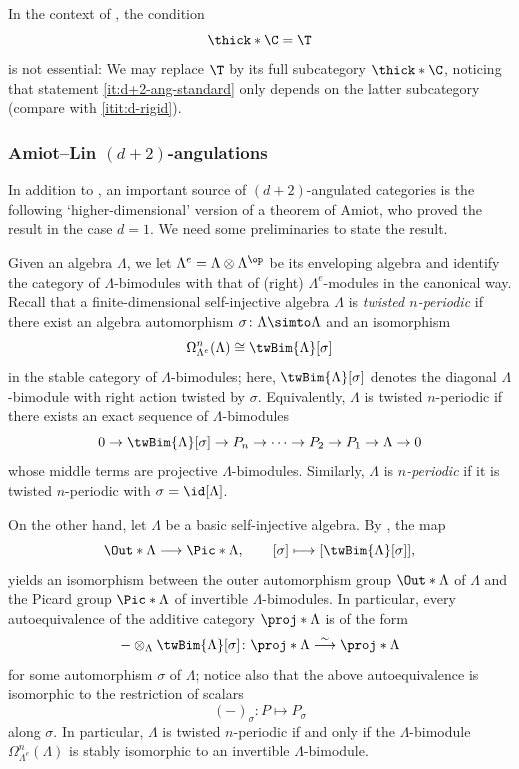 \documentclass[a4paper]{amsart}
\begin{document}
\begin{remark}
  In the context of , the
  condition $$\thick*{\C}=\T$$ is not essential: We may replace $\T$ by its full
  subcategory $\thick*\C$, noticing that statement \eqref{it:d+2-ang-standard}
  only depends on the latter subcategory (compare with \eqref{itit:d-rigid}).
\end{remark}

\subsubsection{Amiot--Lin $(d+2)$-angulations}
\label{subsec:AL_angulations}

In addition to , an important source of $(d+2)$-angulated
categories is the following `higher-dimensional' version of a theorem of Amiot,
who proved the result in the case $d=1$. We need some preliminaries to state the
result.

Given an algebra $\Lambda$, we let $\Lambda^e=\Lambda\otimes\Lambda^\op$ be its
enveloping algebra and identify the category of $\Lambda$-bimodules with
that of (right) $\Lambda^e$-modules in the canonical way. Recall that a
finite-dimensional self-injective algebra $\Lambda$ is \emph{twisted
  $n$-periodic} if there exist an algebra automorphism $\sigma\colon
\Lambda\simto \Lambda$ and an isomorphism
\[
  \Omega_{\Lambda^e}^n(\Lambda)\cong \twBim{\Lambda}[\sigma]
\]
in the stable category of $\Lambda$-bimodules; here, $\twBim{\Lambda}[\sigma]$
denotes the diagonal $\Lambda$-bimodule with right action twisted by $\sigma$.
Equivalently, $\Lambda$ is twisted $n$-periodic if there exists an exact
sequence of $\Lambda$-bimodules
\[
  0\to\twBim{\Lambda}[\sigma]\to P_{n}\to\cdots\to P_2\to P_1\to\Lambda\to0
\]
whose middle terms are projective $\Lambda$-bimodules. Similarly, $\Lambda$ is
\emph{$n$-periodic} if it is twisted $n$-periodic with $\sigma=\id[\Lambda]$.

On the other hand, let $\Lambda$ be a basic self-injective algebra. By
\cite[Prop.~3.8]{Bol84}, the map
\[
  \Out*{\Lambda}\longrightarrow\Pic*{\Lambda},\qquad
  [\sigma]\longmapsto[\twBim{\Lambda}[\sigma]],
\]
yields an isomorphism between the outer automorphism group $\Out*{\Lambda}$ of
$\Lambda$ and the Picard group $\Pic*{\Lambda}$ of invertible
$\Lambda$-bimodules. In particular, every autoequivalence of the additive
category $\proj*{\Lambda}$ is of the form
\[
  -\otimes_\Lambda\twBim{\Lambda}[\sigma]\colon\proj*{\Lambda}\stackrel{\sim}{\longrightarrow}\proj*{\Lambda}
\]
for some automorphism $\sigma$ of $\Lambda$; notice also that the above
autoequivalence is isomorphic to the restriction of scalars
\[
  (-)_{\sigma}\colon P\longmapsto P_{\sigma}
\]
along $\sigma$. In particular, $\Lambda$ is twisted $n$-periodic if and only if
the $\Lambda$-bimodule $\Omega_{\Lambda^e}^n(\Lambda)$ is stably isomorphic to
an invertible $\Lambda$-bimodule.
\end{document}
